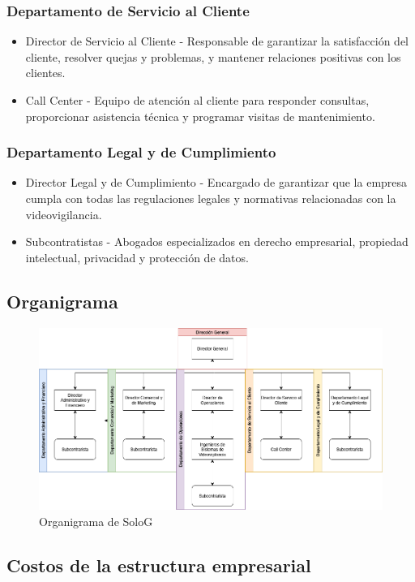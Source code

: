 \documentclass{report}
\begin{document}
            \subsubsection*{Departamento de Servicio al Cliente}
              \begin{itemize}
              \item Director de Servicio al Cliente - Responsable de garantizar la satisfacción del cliente, resolver quejas y problemas, y mantener relaciones positivas con los clientes.
              \item Call Center - Equipo de atención al cliente para responder consultas, proporcionar asistencia técnica y programar visitas de mantenimiento.
              \end{itemize}
            \subsubsection*{Departamento Legal y de Cumplimiento}
              \begin{itemize}
              \item Director Legal y de Cumplimiento - Encargado de garantizar que la empresa cumpla con todas las regulaciones legales y normativas relacionadas con la videovigilancia.
              \item Subcontratistas - Abogados especializados en derecho empresarial, propiedad intelectual, privacidad y protección de datos.
              \end{itemize}
          \subsection{Organigrama}
            \begin{figure}[H]
              \centering
              \includegraphics[width=1\textwidth]{./img/organigrama.png}
              \caption{Organigrama de SoloG}
            \end{figure}
          \clearpage\subsection{Costos de la estructura empresarial}
\end{document}
